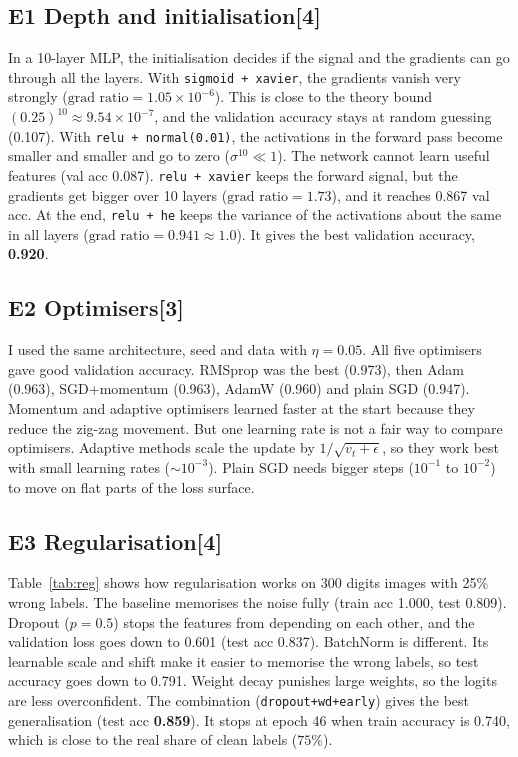 \documentclass[conference,a4paper]{IEEEtran}
\newcommand{\task}[2]{\subsection{#1\hfill[#2]}}
\begin{document}
\task{E1 Depth and initialisation}{4}
In a 10-layer MLP, the initialisation decides if the signal and the gradients can go through all the layers. With \texttt{sigmoid + xavier}, the gradients vanish very strongly ($\text{grad ratio} = 1.05\times 10^{-6}$). This is close to the theory bound $(0.25)^{10} \approx 9.54\times 10^{-7}$, and the validation accuracy stays at random guessing (0.107).
With \texttt{relu + normal(0.01)}, the activations in the forward pass become smaller and smaller and go to zero ($\sigma^{10} \ll 1$). The network cannot learn useful features (val acc 0.087).
\texttt{relu + xavier} keeps the forward signal, but the gradients get bigger over 10 layers ($\text{grad ratio} = 1.73$), and it reaches 0.867 val acc. At the end, \texttt{relu + he} keeps the variance of the activations about the same in all layers ($\text{grad ratio} = 0.941 \approx 1.0$). It gives the best validation accuracy, \textbf{0.920}.

\task{E2 Optimisers}{3}
I used the same architecture, seed and data with $\eta=0.05$. All five optimisers gave good validation accuracy. RMSprop was the best (0.973), then Adam (0.963), SGD+momentum (0.963), AdamW (0.960) and plain SGD (0.947).
Momentum and adaptive optimisers learned faster at the start because they reduce the zig-zag movement. But one learning rate is not a fair way to compare optimisers. Adaptive methods scale the update by $1/\sqrt{v_t + \epsilon}$, so they work best with small learning rates ($\sim 10^{-3}$). Plain SGD needs bigger steps ($10^{-1}$ to $10^{-2}$) to move on flat parts of the loss surface.

\task{E3 Regularisation}{4}
Table~\ref{tab:reg} shows how regularisation works on 300 digits images with 25\% wrong labels. The baseline memorises the noise fully (train acc 1.000, test 0.809). Dropout ($p=0.5$) stops the features from depending on each other, and the validation loss goes down to 0.601 (test acc 0.837).
BatchNorm is different. Its learnable scale and shift make it easier to memorise the wrong labels, so test accuracy goes down to 0.791. Weight decay punishes large weights, so the logits are less overconfident. The combination (\texttt{dropout+wd+early}) gives the best generalisation (test acc \textbf{0.859}). It stops at epoch 46 when train accuracy is 0.740, which is close to the real share of clean labels ($75\%$).
\end{document}
